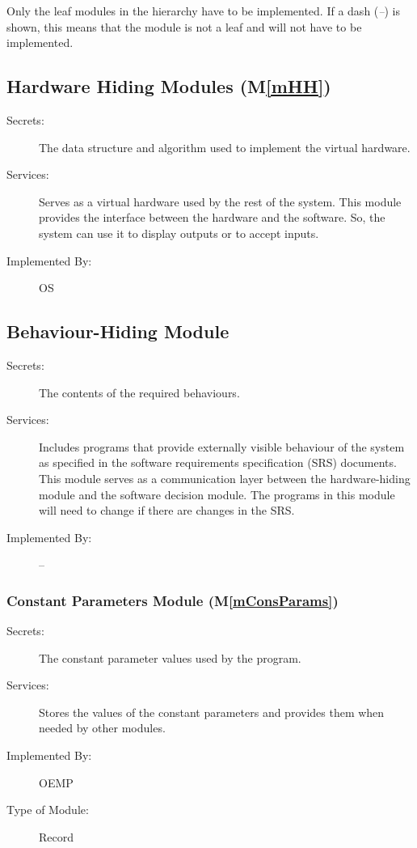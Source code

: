 \documentclass[12pt, titlepage]{article}
\newcommand{\mref}[1]{M\ref{#1}}
\begin{document}
Only the leaf modules in the hierarchy have to be implemented. If a dash
(\emph{--}) is shown, this means that the module is not a leaf and will not have
to be implemented.

\subsection{Hardware Hiding Modules (\mref{mHH})}

\begin{description}
\item[Secrets:]The data structure and algorithm used to implement the virtual
  hardware.
\item[Services:]Serves as a virtual hardware used by the rest of the
  system. This module provides the interface between the hardware and the
  software. So, the system can use it to display outputs or to accept inputs.
\item[Implemented By:] OS
\end{description}

\subsection{Behaviour-Hiding Module}

\begin{description}
\item[Secrets:]The contents of the required behaviours.
\item[Services:]Includes programs that provide externally visible behaviour of
  the system as specified in the software requirements specification (SRS)
  documents. This module serves as a communication layer between the
  hardware-hiding module and the software decision module. The programs in this
  module will need to change if there are changes in the SRS.
\item[Implemented By:] --
\end{description}

\subsubsection{Constant Parameters Module (\mref{mConsParams})}
\begin{description}
  \item[Secrets:]The constant parameter values used by the program.
  \item[Services:]Stores the values of the constant parameters and provides them when needed by other modules.
  \item[Implemented By:] OEMP
  \item[Type of Module:] Record
\end{description}
\end{document}
